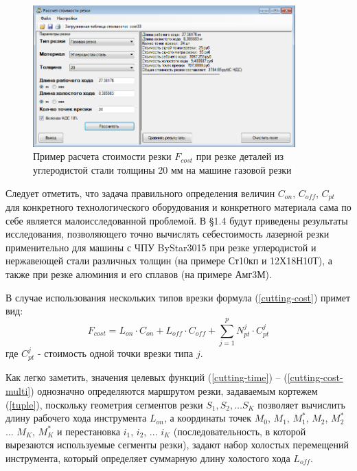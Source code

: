 \documentclass[11pt,twoside]{report}
\begin{document}
\begin{figure}
  \begin{center}
  \includegraphics[width=0.9\textwidth]{cost.png}
  \caption{Пример расчета стоимости резки $F_{cost}$ при резке деталей из углеродистой стали толщины 20 мм на машине газовой резки}
  \label{cost}
  \end{center}
\end{figure}

Следует отметить,
что задача правильного определения величин
$C_{on}$, $C_{off}$, $C_{pt}$
для конкретного технологического оборудования
и конкретного материала сама по себе является малоисследованной проблемой.
В \S 1.4
будут приведены результаты исследования,
позволяющего точно вычислять себестоимость
лазерной резки применительно для машины с ЧПУ
ByStar3015 при резке углеродистой и нержавеющей
стали различных толщин
(на примере Ст10кп и 12Х18Н10Т),
а также при резке алюминия и его сплавов (на примере Амг3М).

В случае использования нескольких типов врезки формула (\ref{cutting-cost}) примет вид:
\begin{equation}
  F_{cost}=
  L_{on} \cdot C_{on} +
  L_{off} \cdot C_{off} +
  \sum_{j=1}^p N_{pt}^j \cdot C_{pt}^j
  \label{cutting-cost-multi}
\end{equation}
где $C_{pt}^j$ - стоимость одной точки врезки типа $j$.

Как легко заметить,
значения целевых функций (\ref{cutting-time}) – (\ref{cutting-cost-multi})
однозначно определяются маршрутом резки, задаваемым кортежем (\ref{tuple}),
поскольку геометрия сегментов резки
$S_1, S_2, \dots S_K$
позволяет вычислить длину рабочего хода инструмента  $L_{on}$,
а координаты точек
$M_0$, $M_1$, $M_1^*$, $M_2$, $M_2^*$ ... $M_K$, $M_K^*$
и перестановка
$i_1$, $i_2$, ... $i_K$
(последовательность, в которой вырезаются используемые сегменты резки),
задают набор холостых перемещений инструмента,
который определяет суммарную длину холостого хода  $L_{off}$.
\end{document}

